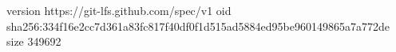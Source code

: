 version https://git-lfs.github.com/spec/v1
oid sha256:334f16e2cc7d361a83fc817f40df0f1d515ad5884ed95be960149865a7a772de
size 349692
